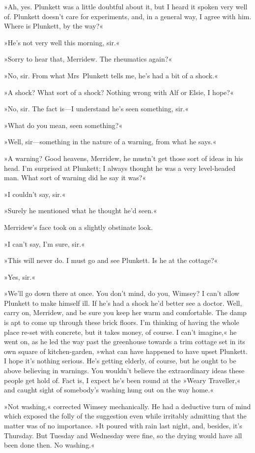 »Ah, yes. Plunkett was a little doubtful about it, but I heard it spoken very well of. Plunkett doesn't care for experiments, and, in a general way, I agree with him. Where is Plunkett, by the way?«

»He's not very well this morning, sir.«

»Sorry to hear that, Merridew. The rheumatics again?«

»No, sir. From what Mrs~Plunkett tells me, he's had a bit of a shock.«

»A shock? What sort of a shock? Nothing wrong with Alf or Elsie, I hope?«

»No, sir. The fact is—I understand he's seen something, sir.«

»What do you mean, seen something?«

»Well, sir—something in the nature of a warning, from what he says.«

»A warning? Good heavens, Merridew, he mustn't get those sort of ideas in his head. I'm surprised at Plunkett; I always thought he was a very level-headed man. What sort of warning did he say it was?«

»I couldn't say, sir.«

»Surely he mentioned what he thought he'd seen.«

Merridew's face took on a slightly obstinate look.

»I can't say, I'm sure, sir.«

»This will never do. I must go and see Plunkett. Is he at the cottage?«

»Yes, sir.«

»We'll go down there at once. You don't mind, do you, Wimsey? I can't allow Plunkett to make himself ill. If he's had a shock he'd better see a doctor. Well, carry on, Merridew, and be sure you keep her warm and comfortable. The damp is apt to come up through these brick floors. I'm thinking of having the whole place re-set with concrete, but it takes money, of course. I can't imagine,« he went on, as he led the way past the greenhouse towards a trim cottage set in its own square of kitchen-garden, »what can have happened to have upset Plunkett. I hope it's nothing serious. He's getting elderly, of course, but he ought to be above believing in warnings. You wouldn't believe the extraordinary ideas these people get hold of. Fact is, I expect he's been round at the »Weary Traveller,« and caught sight of somebody's washing hung out on the way home.«

»Not washing,« corrected Wimsey mechanically. He had a deductive turn of mind which exposed the folly of the suggestion even while irritably admitting that the matter was of no importance. »It poured with rain last night, and, besides, it's Thursday. But Tuesday and Wednesday were fine, so the drying would have all been done then. No washing.«

